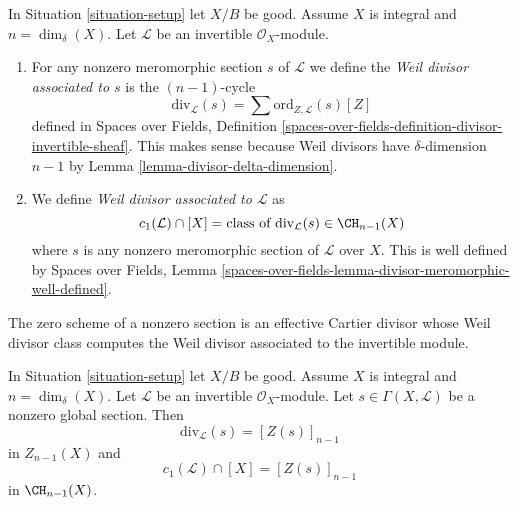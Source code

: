 \begin{definition}
\label{definition-divisor-invertible-sheaf}
In Situation \ref{situation-setup} let $X/B$ be good.
Assume $X$ is integral and $n = \dim_\delta(X)$.
Let $\mathcal{L}$ be an invertible $\mathcal{O}_X$-module.
\begin{enumerate}
\item For any nonzero meromorphic section $s$ of $\mathcal{L}$
we define the {\it Weil divisor associated to $s$} is the
$(n - 1)$-cycle
$$
\text{div}_\mathcal{L}(s) =
\sum \text{ord}_{Z, \mathcal{L}}(s) [Z]
$$
defined in Spaces over Fields, Definition
\ref{spaces-over-fields-definition-divisor-invertible-sheaf}.
This makes sense because Weil divisors have $\delta$-dimension $n - 1$
by Lemma \ref{lemma-divisor-delta-dimension}.
\item We define {\it Weil divisor associated to $\mathcal{L}$} as
$$
c_1(\mathcal{L}) \cap [X] =
\text{class of }\text{div}_\mathcal{L}(s) \in \CH_{n - 1}(X)
$$
where $s$ is any nonzero meromorphic section of $\mathcal{L}$ over
$X$. This is well defined by
Spaces over Fields, Lemma
\ref{spaces-over-fields-lemma-divisor-meromorphic-well-defined}.
\end{enumerate}
\end{definition}

\noindent
The zero scheme of a nonzero section is an effective Cartier divisor
whose Weil divisor class computes the Weil divisor associated to
the invertible module.

\begin{lemma}
\label{lemma-compute-c1}
In Situation \ref{situation-setup} let $X/B$ be good.
Assume $X$ is integral and $n = \dim_\delta(X)$.
Let $\mathcal{L}$ be an invertible $\mathcal{O}_X$-module.
Let $s \in \Gamma(X, \mathcal{L})$ be a nonzero global section.
Then
$$
\text{div}_\mathcal{L}(s) = [Z(s)]_{n - 1}
$$
in $Z_{n - 1}(X)$ and
$$
c_1(\mathcal{L}) \cap [X] = [Z(s)]_{n - 1}
$$
in $\CH_{n - 1}(X)$.
\end{lemma}

